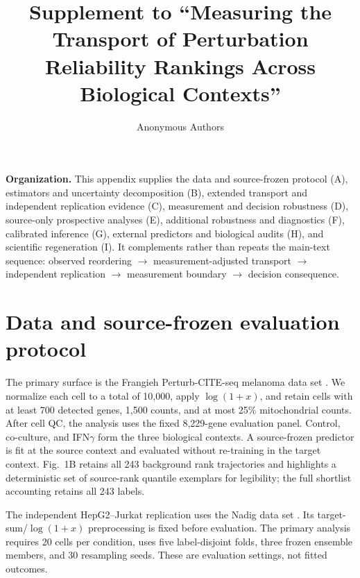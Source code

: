 \documentclass{article}
\title{Supplement to ``Measuring the Transport of Perturbation Reliability Rankings Across Biological Contexts''}
\author{Anonymous Authors}
\begin{document}
\maketitle

\noindent\textbf{Organization.} This appendix supplies the data and source-frozen protocol (A), estimators and uncertainty decomposition (B), extended transport and independent replication evidence (C), measurement and decision robustness (D), source-only prospective analyses (E), additional robustness and diagnostics (F), calibrated inference (G), external predictors and biological audits (H), and scientific regeneration (I). It complements rather than repeats the main-text sequence: observed reordering $\rightarrow$ measurement-adjusted transport $\rightarrow$ independent replication $\rightarrow$ measurement boundary $\rightarrow$ decision consequence.

\section{Data and source-frozen evaluation protocol}
\label{app:data}

The primary surface is the Frangieh Perturb-CITE-seq melanoma data set \citep{frangieh2021multimodal}. We normalize each cell to a total of 10,000, apply $\log(1+x)$, and retain cells with at least 700 detected genes, 1,500 counts, and at most 25\% mitochondrial counts. After cell QC, the analysis uses the fixed 8,229-gene evaluation panel. Control, co-culture, and IFN$\gamma$ form the three biological contexts. A source-frozen predictor is fit at the source context and evaluated without re-training in the target context. Fig.~1B retains all 243 background rank trajectories and highlights a deterministic set of source-rank quantile exemplars for legibility; the full shortlist accounting retains all 243 labels.

The independent HepG2--Jurkat replication uses the Nadig data set \citep{nadig2025trade}. Its target-sum/$\log(1+x)$ preprocessing is fixed before evaluation. The primary analysis requires 20 cells per condition, uses five label-disjoint folds, three frozen ensemble members, and 30 resampling seeds. These are evaluation settings, not fitted outcomes.
\end{document}

